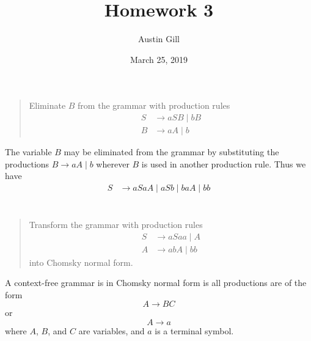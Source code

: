 \documentclass{article}
\title{Homework 3}
\author{Austin Gill}
\date{March 25, 2019}
\begin{document}
\maketitle

\section{}
\begin{quote}
    Eliminate $B$ from the grammar with production rules
    \begin{align*}
        S & \to aSB \mid bB \\
        B & \to aA \mid b
    \end{align*}
\end{quote}

The variable $B$ may be eliminated from the grammar by substituting the productions $B \to aA \mid b$ wherever $B$ is used in another production rule.
Thus we have
\begin{align*}
    S & \to aSaA \mid aSb \mid baA \mid bb
\end{align*}

\section{}
\begin{quote}
    Transform the grammar with production rules
    \begin{align*}
        S & \to aSaa \mid A \\
        A & \to abA \mid bb
    \end{align*}
    into Chomsky normal form.
\end{quote}

\begin{defn}
    A context-free grammar is in Chomsky normal form is all productions are of the form \[A \to BC\] or \[A \to a\] where $A$, $B$, and $C$ are variables, and $a$ is a terminal symbol.
\end{defn}
\end{document}
